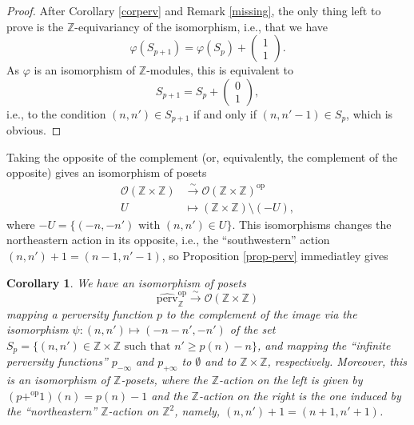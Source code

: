 \documentclass{article}
\newtheorem{cor}[thm]{Corollary}
\theoremstyle{definition}
\newcommand{\Z}{\mathbb{Z}}
\newcommand{\Oo}{\mathcal{O}}
\begin{document}
\begin{proof}
After Corollary \ref{corperv} and Remark \ref{missing}, the only thing left to prove is the $\Z$-equivariancy of the isomorphism, i.e., that we have
\[
\varphi(S_{p+1})=\varphi(S_p)+\left(\begin{smallmatrix}1\\1\end{smallmatrix}\right).
\]
As $\varphi$ is an isomorphism of $\Z$-modules, this is equivalent to
\[
S_{p+1}=S_p+\left(\begin{smallmatrix}0\\1\end{smallmatrix}\right),
\]
i.e., to the condition $(n,n')\in S_{p+1}$ if and only if $(n,n'-1)\in S_{p}$, which is obvious.
\end{proof}
Taking the opposite of the complement (or, equivalently, the complement of the opposite) gives an isomorphism of posets
\begin{align*}
\Oo(\Z\times \Z)&\xrightarrow{\sim} \Oo(\Z\times \Z)^{\mathrm{op}}\\
U&\mapsto (\Z\times \Z)\setminus (-U),
\end{align*}
where $-U=\{(-n,-n')\text{ with } (n,n')\in U\}$. This isomorphisms changes the northeastern action in its opposite, i.e., the ``southwestern'' action  $(n,n')+1=(n-1,n'-1)$, so Proposition \ref{prop-perv} immediatley gives 
\begin{cor}
\label{cor-perv2}
We have an isomorphism of posets
\[
\widehat{\mathrm{perv}}_\Z^{\mathrm{op}}\xrightarrow{\sim} \Oo(\Z\times \Z)
\]
mapping a perversity function $p$ to the complement of the image via the isomorphism $\psi\colon (n,n')\mapsto (-n-n',-n')$ of the set $S_p=\{(n,n')\in \Z\times \Z\text{ such that } n'\geq p(n)-n\}$, and mapping the ``infinite perversity functions'' $p_{-\infty}$ and $p_{+\infty}$ to $\emptyset$ and to $\Z\times \Z$, respectively. Moreover, this is an isomorphism of $\Z$-posets, where the $\Z$-action on the left is given by $(p+^{\mathrm{op}}1)(n)=p(n)-1$ and the $\Z$-action on the right is the one induced by the ``northeastern'' $\Z$-action on $\Z^2$, namely, $(n,n')+1=(n+1,n'+1)$. 
\end{cor}
\end{document}
